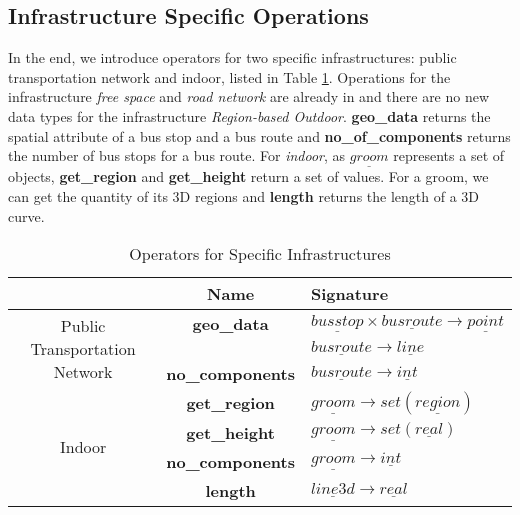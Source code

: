 \subsection{Infrastructure Specific Operations}
\label{sec:specific}
In the end, we introduce operators for two specific infrastructures: public transportation network and indoor, listed in Table \ref{tab:operators3}. Operations for the infrastructure \textit{free space} and \textit{road network} are already in \cite{GBE+00,GA2006} and there are no new data types for the infrastructure \textit{Region-based Outdoor}. \textbf{geo\_data} returns the spatial attribute of a bus stop and a bus route and \textbf{no\_of\_components} returns the number of bus stops for a bus route. 
For \textit{indoor}, as $\underline{groom}$ represents a set of objects, \textbf{get\_region} and \textbf{get\_height} return a set of values. For a groom, we can get the quantity of its 3D regions and \textbf{length} returns the length of a 3D curve.

\begin{table}[ht]
 \begin{center} 
  \begin{tabular}{c|c|l}
    \hline
    &Name & Signature \\
    \hline
    \multirow{3}{*}{Public Transportation Network}&\textbf{geo\_data}&$ \underline{busstop} \times \underline{busroute} \rightarrow \underline{point}$ \\
    & &$ \underline{busroute} \rightarrow \underline{line} $ \\
    &\textbf{no\_components}&$ \underline{busroute} \rightarrow {\underline{int}}$ \\
    \hline
    \multirow{5}{*}{Indoor}&\textbf{get\_region}&$ \underline{groom} \rightarrow set(\underline{region})$ \\
    & \textbf{get\_height} &$ \underline{groom} \rightarrow set(\underline{real})$ \\
    &\textbf{no\_components}&$ \underline{groom} \rightarrow {\underline{int}}$ \\
    &\textbf{length}&$ \underline{line3d} \rightarrow {\underline{real}}$ \\
    \hline
  \end{tabular}
 \end{center}
 \caption{\label{tab:operators3}Operators for Specific Infrastructures}
\end{table}